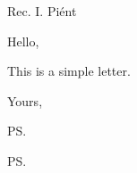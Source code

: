 \documentclass{letter}
\begin{document}
\signature{Derrick Er}
\renewcommand{\today}{2014-07-21}

\begin{letter}{Rec. I. Piént}
  
\opening{Hello,}
This is a simple letter.
\closing{Yours,}

\ps

\ps

\end{letter}
\end{document}
